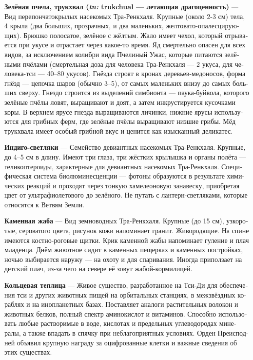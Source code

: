 \documentclass[a4paper,12pt,fleqn]{book}\usepackage{polyglossia}\setdefaultlanguage[babelshorthands=true]{russian}\setotherlanguage{english}\defaultfontfeatures{Ligatures=TeX,Mapping=tex-text}\usepackage{xcolor}\newcommand{\ml}[3]{#2}
\newcommand{\theterm}[3]{\textbf{\hypertarget{#1}{#2}} --- #3}
\newcommand{\theorigin}[3]{\textit{#1:} #2 --- #3}
\begin{document}
\theterm{green-bee}
{Зелёная пчела, трукхвал (\theorigin{tn}{trukchual}{летающая драгоценность})}
{Вид перепончатокрылых насекомых Тра-Ренкхаля.
Крупные (около 2-3 см) тела, 4 крыла (два больших, прозрачных, и два маленьких, желтовато-опалесцирующих).
Брюшко полосатое, зелёное с жёлтым.
Жало имеет чехол, который отрывается при укусе и отрастает через какое-то время.
Яд смертельно опасен для всех видов, за исключением колибри вида Пчелиный Ужас, которые питаются зелёными пчёлами (смертельная доза для человека Тра-Ренкхаля --- 2 укуса, для человека-тси --- 40--80 укусов).
Гнёзда строят в кронах деревьев-медоносов, форма гнёзд --- цепочка шаров (обычно 3--5), от самых маленьких внизу до самых больших сверху.
Гнездо строится из выделений симбионта --- паука-буйвола, которого зелёные пчёлы ловят, выращивают и доят, а затем инкрустируется кусочками коры.
В верхнем ярусе гнезда выращиваются личинки, нижние ярусы используются для грибных ферм, где зелёные пчёлы выращивают низшие грибы.
Мёд трукхвала имеет особый грибной вкус и ценится как изысканный деликатес.}

\theterm{indigo-firefly}
{Индиго-светляки}
{Семейство девиантных насекомых Тра-Ренкхаля.
Крупные, до 4--5 см в длину.
Имеют три глаза, три жёстких крылышка и органы полёта --- геликоптероиды, характерные для девиантных насекомых Тра-Ренкхаля.
Специфическая система биолюминесценции --- фотоны образуются в результате химических реакций и проходят через тонкую хамелеоновую занавеску, приобретая цвет от ультрафиолетового до зелёного.
Не путать с лантерн-светляками, которые относятся к Ветвям Земли.}

\theterm{stonetoad}
{Каменная жаба}
{Вид земноводных Тра-Ренкхаля.
Крупные (до 15 см), узкоротые, сероватого цвета, рисунок кожи напоминает гранит.
Живородящие.
На спине имеются костно-роговые щитки.
Крик каменной жабы напоминает гуление и плач младенца.
Днём животное сидит в каменных пещерках и каменных постройках, ночью выбирается наружу --- на охоту и для спаривания.
Иногда приползает на детский плач, из-за чего на севере её зовут жабой-кормилицей.}

\theterm{ringhouse}
{Кольцевая теплица}
{Живое существо, разработанное на Тси-Ди для обеспечения тси и других животных пищей на орбитальных станциях, в межзвёздных кораблях и на инопланетных базах.
Поставляет аналоги растительных волокон и животных белков, полный спектр аминокислот и витаминов.
Способно использовать любые растворимые в воде, кислотах и предельных углеводородах минералы, а также впадать в спячку при неблагоприятных условиях.
Орден Преисподней объявил крупную награду за оцифрованные клетки и важные сведения об этих существах.}
\end{document}
